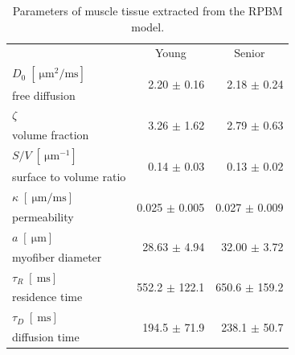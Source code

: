 \begin{table}[!htb]
\vspace{+0.2cm}
\begin{center}
\caption[Parameters of muscle tissue extracted from the RPBM model]{Parameters of muscle tissue extracted from the RPBM model.}
\label{tab:RPBM2}
\begin{tabular}{@{}lrr@{}}
\toprule[1pt]\midrule[0.3pt]
                        								& \multicolumn{1}{c}{Young}         & \multicolumn{1}{c}{Senior}  \\ \cmidrule(){1-3}
$D_0 \; \left[\SI{}{\micro\meter^2\per\milli\second}\right]$      & \multirow{2}{*}{2.20 $\pm$ 0.16}  & \multirow{2}{*}{2.18 $\pm$ 0.24}   \\
free diffusion          								&                                	&                                \\[6pt]
$\zeta$                 								& \multirow{2}{*}{3.26 $\pm$ 1.62}  & \multirow{2}{*}{2.79 $\pm$ 0.63}   \\
volume fraction         								&                                	&                                 \\[6pt]
$S/V \; \left[\SI{}{\micro\meter^{-1}}\right]$                      & \multirow{2}{*}{0.14 $\pm$ 0.03}  & \multirow{2}{*}{0.13 $\pm$ 0.02}   \\
surface to volume ratio 								&                                	&                                 \\[6pt]
$\kappa \; \left[\SI{}{\micro\meter / \milli\second}\right]$		& \multirow{2}{*}{0.025 $\pm$ 0.005}& \multirow{2}{*}{0.027 $\pm$ 0.009} \\
permeability            								&                                	&                                 \\[6pt]
$a \; \left[\SI{}{\micro\meter}\right]$                        	& \multirow{2}{*}{28.63 $\pm$ 4.94} & \multirow{2}{*}{32.00 $\pm$ 3.72}  \\
myofiber diameter       								&                                	&                                 \\[6pt]
$\tau_{R} \; \left[\SI{}{\milli\second}\right]$                        								& \multirow{2}{*}{552.2 $\pm$ 122.1}& \multirow{2}{*}{650.6 $\pm$ 159.2} \\
residence time  								&                                	&                                 \\[6pt]
$\tau_{D} \; \left[\SI{}{\milli\second}\right]$                       								& \multirow{2}{*}{194.5 $\pm$ 71.9} & \multirow{2}{*}{238.1 $\pm$ 50.7}  \\
diffusion time  								&                                	&                                \\ \midrule[0.3pt]\bottomrule[1pt]
\end{tabular}
\end{center}
\vspace{-0.2cm}
\end{table}
